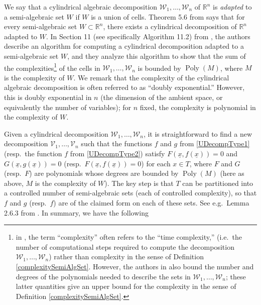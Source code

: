 \documentclass[letterpaper, reqno,11pt]{article}
\numberwithin{equation}{section}
\newcommand{\RR}{\mathbb{R}}
\newcommand{\poly}{\operatorname{Poly}}
\numberwithin{thm}{section}
\theoremstyle{remark}
\begin{document}
We say that a cylindrical algebraic decomposition $\mathcal{W}_1,\ldots,\mathcal{W}_n$ of $\RR^n$ is \emph{adapted} to a semi-algebraic set $W$ if $W$ is a union of cells. Theorem 5.6 from \cite{BPR} says that for every semi-algebraic set $W\subset\RR^n$, there exists a cylindrical decomposition of $\RR^n$ adapted to $W$. In Section 11 (see specifically Algorithm 11.2) from \cite{BPR}, the authors describe an algorithm for computing a cylindrical decomposition adapted to a semi-algebraic set $W$, and they analyze this algorithm to show that the sum of the complexities\footnote{in \cite{BPR}, the term ``complexity'' often refers to the ``time complexity,'' (i.e.~the number of computational steps required to compute the decomposition $\mathcal{W}_1,\ldots,\mathcal{W}_n$) rather than complexity in the sense of Definition \ref{complexitySemiAlgSet}. However, the authors in \cite{BPR} also bound the number and degrees of the polynomials needed to describe the sets in $\mathcal{W}_1,\ldots,\mathcal{W}_n$; these latter quantities give an upper bound for the complexity in the sense of Definition \ref{complexitySemiAlgSet}.} of the cells in $\mathcal{W}_1,\ldots,\mathcal{W}_n$ is bounded by $\poly(M)$, where $M$ is the complexity of $W$. We remark that the complexity of the cylindrical algebraic decomposition is often referred to as ``doubly exponential.'' However, this is doubly exponential in $n$ (the dimension of the ambient space, or equivalently the number of variables); for $n$ fixed, the complexity is polynomial in the complexity of $W$.

Given a cylindrical decomposition $\mathcal{W}_1,\ldots,\mathcal{W}_n$, it is straightforward to find a new decomposition $\mathcal{V}_1,\ldots,\mathcal{V}_n$ such that the functions $f$ and $g$ from \eqref{UDecompType1} (resp.~the function $f$ from \eqref{UDecompType2}) satisfy $F(\underline x, f(\underline x))=0$ and $G(\underline x, g(\underline x)) = 0$ (resp.~$F(\underline x, f(\underline x))=0$) for each $x\in T$, where $F$ and $G$ (resp.~$F$) are polynomials whose degrees are bounded by $\poly(M)$ (here as above, $M$ is the complexity of $W$). The key step is that $T$ can be partitioned into a controlled number of semi-algebraic sets (each of controlled complexity), so that $f$ and $g$ (resp.~$f$) are of the claimed form on each of these sets. See e.g.~Lemma 2.6.3 from \cite{BCR}. In summary, we have the following






\end{document}
